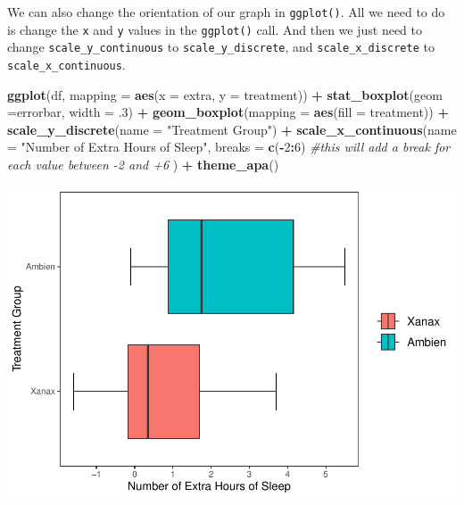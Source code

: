 \documentclass[
]{book}
\newenvironment{Shaded}{\begin{snugshade}}{\end{snugshade}}
\newcommand{\AttributeTok}[1]{\textcolor[rgb]{0.13,0.29,0.53}{#1}}
\newcommand{\CommentTok}[1]{\textcolor[rgb]{0.56,0.35,0.01}{\textit{#1}}}
\newcommand{\DecValTok}[1]{\textcolor[rgb]{0.00,0.00,0.81}{#1}}
\newcommand{\FunctionTok}[1]{\textcolor[rgb]{0.13,0.29,0.53}{\textbf{#1}}}
\newcommand{\NormalTok}[1]{#1}
\newcommand{\SpecialCharTok}[1]{\textcolor[rgb]{0.81,0.36,0.00}{\textbf{#1}}}
\newcommand{\StringTok}[1]{\textcolor[rgb]{0.31,0.60,0.02}{#1}}
\begin{document}
We can also change the orientation of our graph in \texttt{ggplot()}. All we need to do is change the \texttt{x} and \texttt{y} values in the \texttt{ggplot()} call. And then we just need to change \texttt{scale\_y\_continuous} to \texttt{scale\_y\_discrete}, and \texttt{scale\_x\_discrete} to \texttt{scale\_x\_continuous}.

\begin{Shaded}
\begin{Highlighting}[]
\FunctionTok{ggplot}\NormalTok{(df, }\AttributeTok{mapping =} \FunctionTok{aes}\NormalTok{(}\AttributeTok{x =}\NormalTok{ extra, }\AttributeTok{y =}\NormalTok{ treatment)) }\SpecialCharTok{+} 
  \FunctionTok{stat\_boxplot}\NormalTok{(}\AttributeTok{geom =}\StringTok{\textquotesingle{}errorbar\textquotesingle{}}\NormalTok{, }\AttributeTok{width =}\NormalTok{ .}\DecValTok{3}\NormalTok{) }\SpecialCharTok{+}
  \FunctionTok{geom\_boxplot}\NormalTok{(}\AttributeTok{mapping =} \FunctionTok{aes}\NormalTok{(}\AttributeTok{fill =}\NormalTok{ treatment)) }\SpecialCharTok{+} 
  \FunctionTok{scale\_y\_discrete}\NormalTok{(}\AttributeTok{name =} \StringTok{"Treatment Group"}\NormalTok{) }\SpecialCharTok{+} 
  \FunctionTok{scale\_x\_continuous}\NormalTok{(}\AttributeTok{name =} \StringTok{"Number of Extra Hours of Sleep"}\NormalTok{, }
                     \AttributeTok{breaks =} \FunctionTok{c}\NormalTok{(}\SpecialCharTok{{-}}\DecValTok{2}\SpecialCharTok{:}\DecValTok{6}\NormalTok{) }\CommentTok{\#this will add a break for each value between {-}2 and +6}
\NormalTok{                     ) }\SpecialCharTok{+}
  \FunctionTok{theme\_apa}\NormalTok{()}
\end{Highlighting}
\end{Shaded}

\includegraphics{rintro_demo_files/figure-latex/unnamed-chunk-298-1.pdf}
\end{document}
